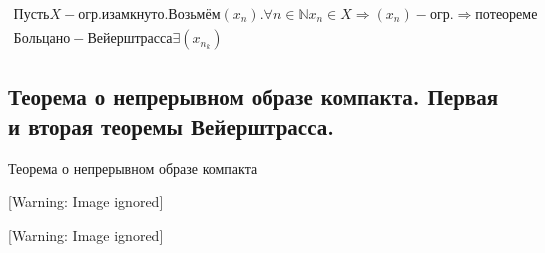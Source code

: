 \documentclass[a4paper]{article}
\begin{document}
\begin{equation*}
\begin{gathered}
\mathit{\text{П}\text{у}\text{с}\text{т}\text{ь}}X-\mathit{\text{о}\text{г}\text{р}.}\text{и}\mathit{\text{з}\text{а}\text{м}\text{к}\text{н}\text{у}\text{т}\text{о}.}\mathit{\text{В}\text{о}\text{з}\text{ь}\text{м}\text{ё}\text{м}}(x_n).\forall
n\in \mathbb{N}x_n\in X\Rightarrow (x_n)-\mathit{\text{о}\text{г}\text{р}.}\Rightarrow
\mathit{\text{п}\text{о}}\mathit{\text{т}\text{е}\text{о}\text{р}\text{е}\text{м}\text{е}}\\\mathit{\text{Б}\text{о}\text{л}\text{ь}\text{ц}\text{а}\text{н}\text{о}}-\mathit{\text{В}\text{е}\text{й}\text{е}\text{р}\text{ш}\text{т}\text{р}\text{а}\text{с}\text{с}\text{а}}\exists
(x_{n_k})\end{gathered}
\end{equation*}
\subsection{Теорема о непрерывном образе компакта. Первая и вторая теоремы Вейерштрасса.}
Теорема о непрерывном образе компакта

  [Warning: Image ignored] %
 

  [Warning: Image ignored] %
 
\end{document}
